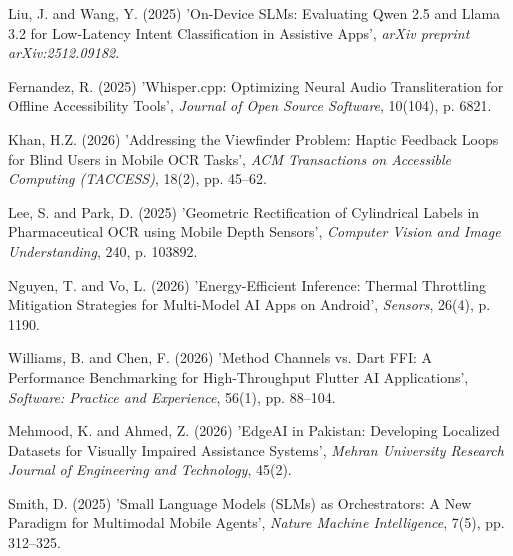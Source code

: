 \documentclass[12pt,a4paper]{report}
\begin{document}
\begin{enumerate}[label={[\arabic*]}, leftmargin=3em, itemsep=1em]
    \item Liu, J. and Wang, Y. (2025) 'On-Device SLMs: Evaluating Qwen 2.5 and Llama 3.2 for Low-Latency Intent Classification in Assistive Apps', \textit{arXiv preprint arXiv:2512.09182}.
 
    \item Fernandez, R. (2025) 'Whisper.cpp: Optimizing Neural Audio Transliteration for Offline Accessibility Tools', \textit{Journal of Open Source Software}, 10(104), p. 6821.
 
    \item Khan, H.Z. (2026) 'Addressing the Viewfinder Problem: Haptic Feedback Loops for Blind Users in Mobile OCR Tasks', \textit{ACM Transactions on Accessible Computing (TACCESS)}, 18(2), pp. 45--62.
 
    \item Lee, S. and Park, D. (2025) 'Geometric Rectification of Cylindrical Labels in Pharmaceutical OCR using Mobile Depth Sensors', \textit{Computer Vision and Image Understanding}, 240, p. 103892.
 
    \item Nguyen, T. and Vo, L. (2026) 'Energy-Efficient Inference: Thermal Throttling Mitigation Strategies for Multi-Model AI Apps on Android', \textit{Sensors}, 26(4), p. 1190.
 
    \item Williams, B. and Chen, F. (2026) 'Method Channels vs. Dart FFI: A Performance Benchmarking for High-Throughput Flutter AI Applications', \textit{Software: Practice and Experience}, 56(1), pp. 88--104.
 
    \item Mehmood, K. and Ahmed, Z. (2026) 'EdgeAI in Pakistan: Developing Localized Datasets for Visually Impaired Assistance Systems', \textit{Mehran University Research Journal of Engineering and Technology}, 45(2).
 
    \item Smith, D. (2025) 'Small Language Models (SLMs) as Orchestrators: A New Paradigm for Multimodal Mobile Agents', \textit{Nature Machine Intelligence}, 7(5), pp. 312--325.
\end{enumerate}



\appendix %
\end{document}
